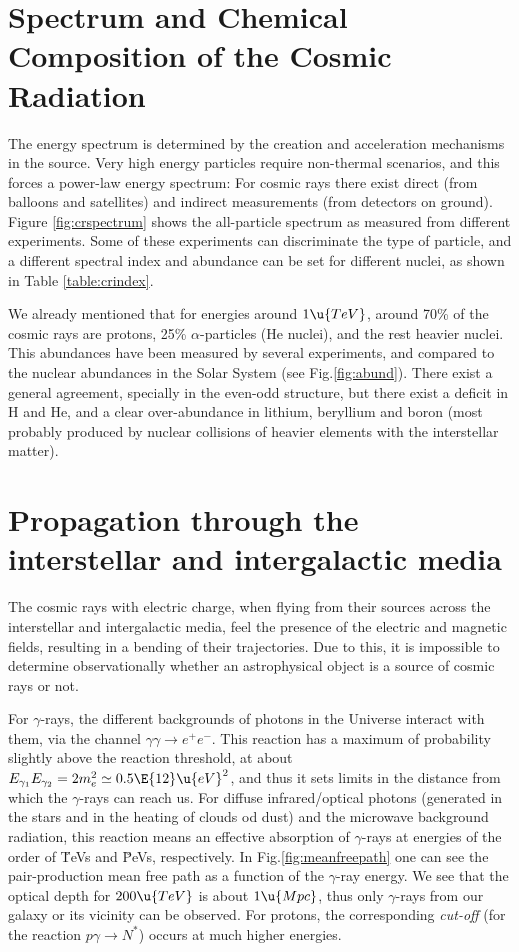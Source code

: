 \section{Spectrum and Chemical Composition of the Cosmic Radiation}
\label{sec:crspectrum}

The energy spectrum is determined by the creation and acceleration
mechanisms in the source. Very high energy particles require
non-thermal scenarios, and this forces a power-law energy spectrum:
%
\powerlaweq
%
For cosmic rays there exist direct (from balloons and satellites) and
indirect measurements (from detectors on ground).  Figure
\ref{fig:crspectrum} shows the all-particle spectrum as measured from
different experiments.  Some of these experiments can discriminate the
type of particle, and a different spectral index and abundance can be
set for different nuclei, as shown in Table \ref{table:crindex}. 

\CRfluxindextable

We already mentioned that for energies around $1\u{TeV}$, around 70\%
of the cosmic rays are protons, 25\% $\alpha$-particles (He nuclei),
and the rest heavier nuclei. This abundances have been measured by
several experiments, and compared to the nuclear abundances in the
Solar System (see Fig.\ref{fig:abund}). There exist a general
agreement, specially in the even-odd structure, but there exist a
deficit in H and He, and a clear over-abundance in lithium, beryllium
and boron (most probably produced by nuclear collisions of heavier
elements with the interstellar matter).

\abundfig

\section{Propagation through the interstellar and
  intergalactic media}

The cosmic rays with electric charge, when flying from their sources
across the interstellar and intergalactic media, feel the presence of
the electric and magnetic fields, resulting in a bending of their
trajectories.  Due to this, it is impossible to determine
observationally whether an astrophysical object is a source of cosmic
rays or not.

For $\gamma$-rays, the different backgrounds of photons in the
Universe interact with them, via the channel $\gamma\gamma \to
e^+e^-$.  This reaction has a maximum of probability slightly above
the reaction threshold, at about $E_{\gamma_1}E_{\gamma_2} = 2 m_e^2
\simeq 0.5\E{12}\u{eV}^2$, and thus it sets limits in the distance
from which the $\gamma$-rays can reach us.  For diffuse
infrared/optical photons (generated in the stars and in the heating of
clouds od dust) and the microwave background radiation, this reaction
means an effective absorption of $\gamma$-rays at energies of the
order of \u{TeV}s and \u{PeV}s, respectively. In
Fig.\ref{fig:meanfreepath} one can see the pair-production mean free
path as a function of the $\gamma$-ray energy. We see that the optical
depth for $200\u{TeV}$ is about $1\u{Mpc}$, thus only $\gamma$-rays
from our galaxy or its vicinity can be observed. For protons, the
corresponding \emph{cut-off} (for the reaction $p\gamma \to N^*$)
occurs at much higher energies.


